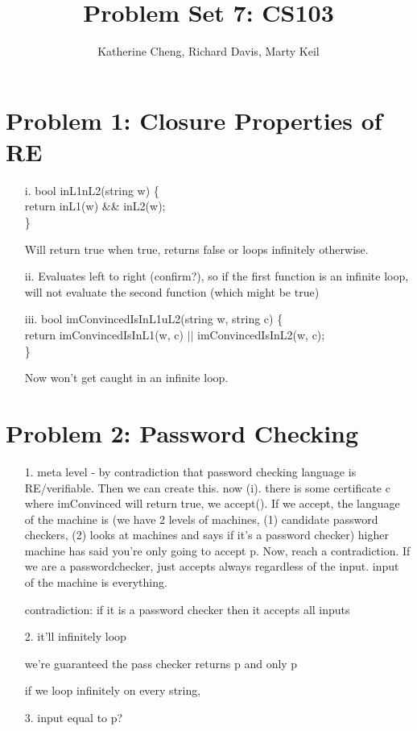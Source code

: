\documentclass[10pt,letter]{article}
\begin{document}

\title{Problem Set 7: CS103}

\author{Katherine Cheng, Richard Davis, Marty Keil}

 
\maketitle

\section*{Problem 1: Closure Properties of RE}

\begin{enumerate}
\item[i.] 
bool inL1nL2(string w) \{\\
return inL1(w) \&\& inL2(w);\\
\}

Will return true when true, returns false or loops infinitely otherwise.
\item[ii.] Evaluates left to right (confirm?), so if the first function is an infinite loop, will not evaluate the second function (which might be true)
\item[iii.] 
bool imConvincedIsInL1uL2(string w, string c) \{\\
return imConvincedIsInL1(w, c) $||$  imConvincedIsInL2(w, c);\\
\}

Now won't get caught in an infinite loop.
\end{enumerate}

\section*{Problem 2: Password Checking}
\begin{enumerate}
\item[1.] 
meta level - by contradiction that password checking language is RE/verifiable. Then we can create this. now (i). there is some certificate c where imConvinced will return true, we accept(). If we accept, the language of the machine is (we have 2 levels of machines, (1) candidate password checkers, (2) looks at machines and says if it's a password checker) higher machine has said you're only going to accept p. Now, reach a contradiction. If we are a passwordchecker, just accepts always regardless of the input. input of the machine is everything.

contradiction: if it is a password checker then it accepts all inputs
\item[2.]
it'll infinitely loop 

we're guaranteed the pass checker returns p and only p

if we loop infinitely on every string, 
\item[3.]
input equal to p?
\end{enumerate}
\end{document}
